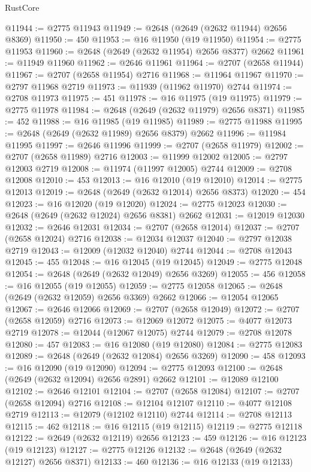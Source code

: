 \begin{lexlean}{RustCore}
\begin{coremodule}
@11944 := @2775 @11943
@11949 := @2648 (@2649 (@2632 @11944) @2656 @8369)
@11950 := 450
@11953 := @16 @11950 (@19 @11950)
@11954 := @2775 @11953
@11960 := @2648 (@2649 (@2632 @11954) @2656 @8377) @2662
@11961 := @11949 @11960
@11962 := @2646 @11961
@11964 := @2707 (@2658 @11944)
@11967 := @2707 (@2658 @11954) @2716
@11968 := @11964 @11967
@11970 := @2797 @11968 @2719
@11973 := @11939 (@11962 @11970) @2744
@11974 := @2708 @11973
@11975 := 451
@11978 := @16 @11975 (@19 @11975)
@11979 := @2775 @11978
@11984 := @2648 (@2649 (@2632 @11979) @2656 @8371)
@11985 := 452
@11988 := @16 @11985 (@19 @11985)
@11989 := @2775 @11988
@11995 := @2648 (@2649 (@2632 @11989) @2656 @8379) @2662
@11996 := @11984 @11995
@11997 := @2646 @11996
@11999 := @2707 (@2658 @11979)
@12002 := @2707 (@2658 @11989) @2716
@12003 := @11999 @12002
@12005 := @2797 @12003 @2719
@12008 := @11974 (@11997 @12005) @2744
@12009 := @2708 @12008
@12010 := 453
@12013 := @16 @12010 (@19 @12010)
@12014 := @2775 @12013
@12019 := @2648 (@2649 (@2632 @12014) @2656 @8373)
@12020 := 454
@12023 := @16 @12020 (@19 @12020)
@12024 := @2775 @12023
@12030 := @2648 (@2649 (@2632 @12024) @2656 @8381) @2662
@12031 := @12019 @12030
@12032 := @2646 @12031
@12034 := @2707 (@2658 @12014)
@12037 := @2707 (@2658 @12024) @2716
@12038 := @12034 @12037
@12040 := @2797 @12038 @2719
@12043 := @12009 (@12032 @12040) @2744
@12044 := @2708 @12043
@12045 := 455
@12048 := @16 @12045 (@19 @12045)
@12049 := @2775 @12048
@12054 := @2648 (@2649 (@2632 @12049) @2656 @3269)
@12055 := 456
@12058 := @16 @12055 (@19 @12055)
@12059 := @2775 @12058
@12065 := @2648 (@2649 (@2632 @12059) @2656 @3369) @2662
@12066 := @12054 @12065
@12067 := @2646 @12066
@12069 := @2707 (@2658 @12049)
@12072 := @2707 (@2658 @12059) @2716
@12073 := @12069 @12072
@12075 := @4077 @12073 @2719
@12078 := @12044 (@12067 @12075) @2744
@12079 := @2708 @12078
@12080 := 457
@12083 := @16 @12080 (@19 @12080)
@12084 := @2775 @12083
@12089 := @2648 (@2649 (@2632 @12084) @2656 @3269)
@12090 := 458
@12093 := @16 @12090 (@19 @12090)
@12094 := @2775 @12093
@12100 := @2648 (@2649 (@2632 @12094) @2656 @2891) @2662
@12101 := @12089 @12100
@12102 := @2646 @12101
@12104 := @2707 (@2658 @12084)
@12107 := @2707 (@2658 @12094) @2716
@12108 := @12104 @12107
@12110 := @4077 @12108 @2719
@12113 := @12079 (@12102 @12110) @2744
@12114 := @2708 @12113
@12115 := 462
@12118 := @16 @12115 (@19 @12115)
@12119 := @2775 @12118
@12122 := @2649 (@2632 @12119) @2656
@12123 := 459
@12126 := @16 @12123 (@19 @12123)
@12127 := @2775 @12126
@12132 := @2648 (@2649 (@2632 @12127) @2656 @8371)
@12133 := 460
@12136 := @16 @12133 (@19 @12133)

\end{coremodule}
\end{lexlean}

